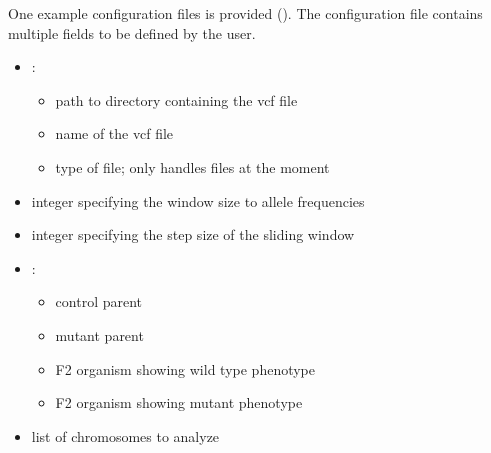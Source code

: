 \documentclass[letterpaper,10pt,english]{sphinxhowto}
\begin{document}
\sphinxAtStartPar
One example configuration files is provided (). The configuration file  contains multiple fields to be defined by the user.
\begin{itemize}
\item {} 
\sphinxAtStartPar
{}:
\begin{itemize}
\item {} 
\sphinxAtStartPar
{} \sphinxhyphen{} path to directory containing the vcf file

\item {} 
\sphinxAtStartPar
{} \sphinxhyphen{} name of the vcf file

\item {} 
\sphinxAtStartPar
{} \sphinxhyphen{} type of file; only handles  files at the moment

\end{itemize}

\item {} 
\sphinxAtStartPar
{} \sphinxhyphen{} integer specifying the window size to allele frequencies

\item {} 
\sphinxAtStartPar
{} \sphinxhyphen{} integer specifying the step size of the sliding window

\item {} 
\sphinxAtStartPar
{}:
\begin{itemize}
\item {} 
\sphinxAtStartPar
{} \sphinxhyphen{} control parent

\item {} 
\sphinxAtStartPar
{} \sphinxhyphen{} mutant parent

\item {} 
\sphinxAtStartPar
{} \sphinxhyphen{} F2 organism showing wild type phenotype

\item {} 
\sphinxAtStartPar
{} \sphinxhyphen{} F2 organism showing mutant phenotype

\end{itemize}

\item {} 
\sphinxAtStartPar
{} \sphinxhyphen{} list of chromosomes to analyze

\end{itemize}
\end{document}
